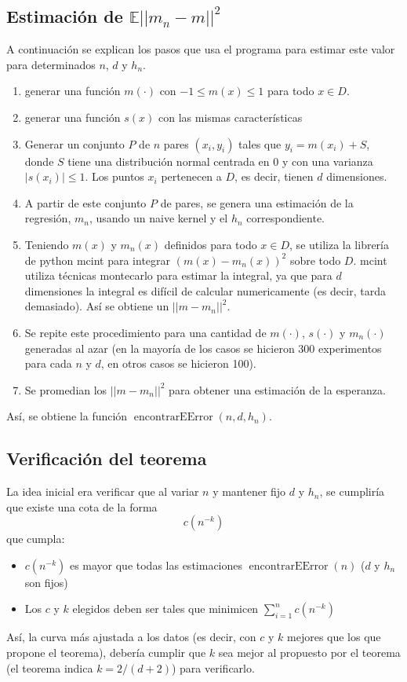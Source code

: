 \documentclass[12pt, a4paper]{article}
\begin{document}
\subsection{Estimación de $\mathds{E}|| m_n-m ||^2$}
A continuación se explican los pasos que usa el programa para estimar este valor para determinados $n$, $d$ y $h_n$.
\begin{enumerate}
  \item generar una función $m(\cdot)$ con $-1 \leq m(x) \leq 1$ para todo $x \in D$.
  \item generar una función $s(x)$ con las mismas características
  \item Generar un conjunto $P$ de $n$ pares $(x_i,y_i)$ tales que $y_i = m(x_i) + S$, donde $S$ tiene una distribución normal centrada en 0 y con una varianza $|s(x_i)| \leq 1$. Los puntos $x_i$ pertenecen a $D$, es decir, tienen $d$ dimensiones.
  \item A partir de este conjunto $P$ de pares, se genera una estimación de la regresión, $m_n$, usando un naive kernel y el $h_n$ correspondiente.
  \item Teniendo $m(x)$ y $m_n(x)$ definidos para todo $x\in D$, se utiliza la librería de python mcint para integrar $(m(x)-m_n(x))^2$ sobre todo $D$. mcint utiliza técnicas montecarlo para estimar la integral, ya que para $d$ dimensiones la integral es difícil de calcular numericamente (es decir, tarda demasiado). Así se obtiene un $||m-m_n||^2$.
  \item Se repite este procedimiento para una cantidad de $m(\cdot)$, $s(\cdot)$ y $m_n(\cdot)$ generadas al azar (en la mayoría de los casos se hicieron 300 experimentos para cada $n$ y $d$, en otros casos se hicieron 100).
  \item Se promedian los $||m-m_n||^2$ para obtener una estimación de la esperanza.
\end{enumerate}
Así, se obtiene la función $\mathop{encontrarEError}(n,d,h_n)$.

\subsection{Verificación del teorema}
La idea inicial era verificar que al variar $n$ y mantener fijo $d$ y $h_n$, se cumpliría que existe una cota de la forma $$c(n^{-k})$$ que cumpla:
\begin{itemize}
  \item $c(n^{-k})$ es mayor que todas las estimaciones $\mathop{encontrarEError}(n)$ ($d$ y $h_n$ son fijos)
  \item Los $c$ y $k$ elegidos deben ser tales que minimicen $\sum_{i=1}^n c(n^{-k})$
\end{itemize}
Así, la curva más ajustada a los datos (es decir, con $c$ y $k$ mejores que los que propone el teorema), debería cumplir que $k$ sea mejor al propuesto por el teorema (el teorema indica $k=2/(d+2)$) para verificarlo.
\end{document}
